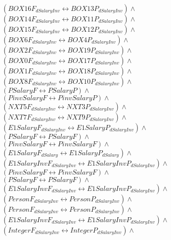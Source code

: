 \documentclass[a4paper,10pt]{article}
\begin{document}
 $ (BOX16F_{dSalaryInv} \leftrightarrow BOX13P_{dSalaryInv}) \land $ \\ 
 $ (BOX14F_{dSalaryInv} \leftrightarrow BOX11P_{dSalaryInv}) \land $ \\ 
 $ (BOX15F_{dSalaryInv} \leftrightarrow BOX12P_{dSalaryInv}) \land $ \\ 
 $ (BOX6F_{dSalaryInv} \leftrightarrow BOX4P_{dSalaryInv}) \land $ \\ 
 $ (BOX2F_{dSalaryInv} \leftrightarrow BOX19P_{dSalaryInv}) \land $ \\ 
 $ (BOX0F_{dSalaryInv} \leftrightarrow BOX17P_{dSalaryInv}) \land $ \\ 
 $ (BOX1F_{dSalaryInv} \leftrightarrow BOX18P_{dSalaryInv}) \land $ \\ 
 $ (BOX8F_{dSalaryInv} \leftrightarrow BOX10P_{dSalaryInv}) \land $ \\ 
 $ (PSalaryF \leftrightarrow PSalaryP) \land $ \\ 
 $ (PinvSalaryF \leftrightarrow PinvSalaryP) \land $ \\ 
 $ (NXT5F_{dSalaryInv} \leftrightarrow NXT3P_{dSalaryInv}) \land $ \\ 
 $ (NXT7F_{dSalaryInv} \leftrightarrow NXT9P_{dSalaryInv}) \land $ \\ 
 $ (E1SalaryF_{dSalaryInv} \leftrightarrow E1SalaryP_{dSalaryInv}) \land $ \\ 
 $ (PSalaryF \leftrightarrow PSalaryF) \land $ \\ 
 $ (PinvSalaryF \leftrightarrow PinvSalaryF) \land $ \\ 
 $ (E1SalaryF_{dSalary} \leftrightarrow E1SalaryP_{dSalary}) \land $ \\ 
 $ (E1SalaryInvF_{dSalaryInv} \leftrightarrow E1SalaryInvP_{dSalaryInv}) \land $ \\ 
 $ (PinvSalaryF \leftrightarrow PinvSalaryF) \land $ \\ 
 $ (PSalaryF \leftrightarrow PSalaryF) \land $ \\ 
 $ (E1SalaryInvF_{dSalaryInv} \leftrightarrow E1SalaryInvP_{dSalaryInv}) \land $ \\ 
 $ (PersonF_{dSalaryInv} \leftrightarrow PersonP_{dSalaryInv}) \land $ \\ 
 $ (PersonF_{dSalaryInv} \leftrightarrow PersonP_{dSalaryInv}) \land $ \\ 
 $ (E1SalaryInvF_{dSalaryInv} \leftrightarrow E1SalaryInvP_{dSalaryInv}) \land $ \\ 
 $ (IntegerF_{dSalaryInv} \leftrightarrow IntegerP_{dSalaryInv}) \land $ \\ 
\end{document}
